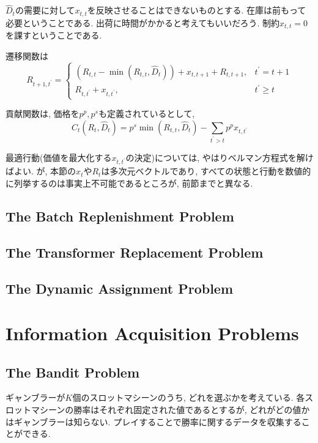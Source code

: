 \documentclass[11pt]{jsbook}
\begin{document}
$\hat{D}_t$の需要に対して$x_{t,t}$を反映させることはできないものとする.
在庫は前もって必要ということである. 出荷に時間がかかると考えてもいいだろう.
制約$x_{t,t} = 0$を課すということである.

遷移関数は
\begin{equation}
	R_{t+1,t^\prime} = \begin{cases}
		\left( R_{t,t} - \min (R_{t,t}, \hat{D}_t) \right) + x_{t,t+1} + R_{t,t+1}, &t^\prime = t+1\\
		R_{t,t^\prime} + x_{t,t^\prime}, &t^\prime \ge t
	\end{cases}
\end{equation}

貢献関数は, 価格を$p^p,p^s$も定義されているとして,
\begin{equation}
	C_t(R_t, \hat{D}_t) = p^s \min (R_{t,t}, \hat{D}_t) - \sum_{t^\prime > t} p^p x_{t,t^\prime} 
\end{equation}

最適行動(価値を最大化する$x_{t,t^\prime}$の決定)については, やはりベルマン方程式を解けばよい.
が, 本節の$x_t$や$R_t$は多次元ベクトルであり,
すべての状態と行動を数値的に列挙するのは事実上不可能であるところが, 前節までと異なる.
\subsection{The Batch Replenishment Problem}
\subsection{The Transformer Replacement Problem}
\subsection{The Dynamic Assignment Problem}
\section{Information Acquisition Problems}
\subsection{The Bandit Problem}
ギャンブラーが$K$個のスロットマシーンのうち, どれを選ぶかを考えている.
各スロットマシーンの勝率はそれぞれ固定された値であるとするが, どれがどの値かはギャンブラーは知らない.
プレイすることで勝率に関するデータを収集することができる.
\end{document}
